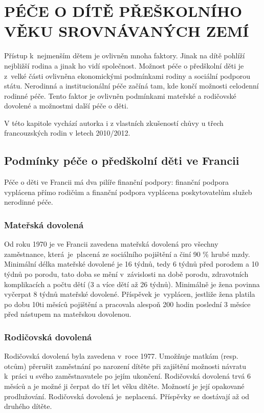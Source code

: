 \chapter{PÉČE O DÍTĚ PŘEŠKOLNÍHO VĚKU SROVNÁVANÝCH ZEMÍ}

	Přístup k nejmenším dětem je ovlivněn mnoha faktory. Jinak na dítě pohlíží nejbližší rodina a jinak ho vidí společnost. Možnost péče o předškolní děti je z velké části ovlivněna ekonomickými podmínkami rodiny a sociální podporou státu. Nerodinná a institucionální péče začíná tam, kde končí možnosti celodenní rodinné péče. Tento faktor je ovlivněn podmínkami mateřské a rodičovské dovolené a možnostmi další péče o děti.

	V této kapitole vychází autorka i z vlastních zkušeností chůvy u třech francouzských rodin v letech 2010/2012.

		\section{Podmínky péče o předškolní děti ve Francii}
		Péče o děti ve Francii má dva pilíře finanční podpory: finanční podpora vyplácena přímo rodičům a finanční podpora vyplácena poskytovatelům služeb nerodinné péče. 


			\subsection{Mateřská dovolená}
				Od roku 1970 je ve Francii zavedena mateřská dovolená pro všechny zaměstnance, která je placená ze sociálního pojištění a činí 90 \% hrubé mzdy. Minimální délka mateřské dovolené je 16 týdnů, tedy 6 týdnů před porodem a 10 týdnů po porodu, tato doba se mění v závislosti na době porodu, zdravotních komplikacích a počtu dětí (3 a více dětí až 26 týdnů). Minimálně je žena povinna vyčerpat 8 týdnů mateřské dovolené. Příspěvek je vyplácen, jestliže žena platila po dobu 10ti měsíců pojištění a pracovala alespoň 200 hodin poslední 3 měsíce před nástupem na mateřskou dovolenou. \citep{Dennipece}

			\subsection{Rodičovská dovolená}
				Rodičovská dovolená byla zavedena v roce 1977. Umožňuje matkám (resp. otcům) přerušit zaměstnání po narození dítěte při zajištění možnosti návratu k práci u svého zaměstnavatele po jejím ukončení. Rodičovská dovolená trvá 6 měsíců a je možné ji čerpat do tří let věku dítěte. Možností je její opakované prodlužování. Rodičovská dovolená je neplacená. Příspěvky se dostávají až od druhého dítěte. 

